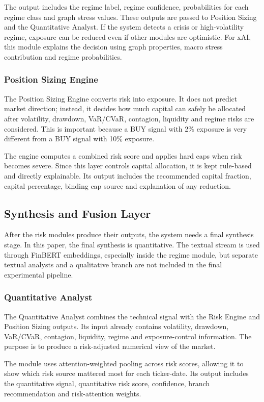 \documentclass[conference]{IEEEtran}
\begin{document}
The output includes the regime label, regime confidence, probabilities for each regime class and graph stress values. These outputs are passed to Position Sizing and the Quantitative Analyst. If the system detects a crisis or high-volatility regime, exposure can be reduced even if other modules are optimistic. For xAI, this module explains the decision using graph properties, macro stress contribution and regime probabilities.
\subsubsection{Position Sizing Engine}
The Position Sizing Engine converts risk into exposure. It does not predict market direction; instead, it decides how much capital can safely be allocated after volatility, drawdown, VaR/CVaR, contagion, liquidity and regime risks are considered. This is important because a BUY signal with 2\% exposure is very different from a BUY signal with 10\% exposure.

The engine computes a combined risk score and applies hard caps when risk becomes severe. Since this layer controls capital allocation, it is kept rule-based and directly explainable. Its output includes the recommended capital fraction, capital percentage, binding cap source and explanation of any reduction.


\subsection{Synthesis and Fusion Layer}
After the risk modules produce their outputs, the system needs a final synthesis stage. In this paper, the final synthesis is quantitative. The textual stream is used through FinBERT embeddings, especially inside the regime module, but separate textual analysts and a qualitative branch are not included in the final experimental pipeline.

\subsubsection{Quantitative Analyst}
The Quantitative Analyst combines the technical signal with the Risk Engine and Position Sizing outputs. Its input already contains volatility, drawdown, VaR/CVaR, contagion, liquidity, regime and exposure-control information. The purpose is to produce a risk-adjusted numerical view of the market.

The module uses attention-weighted pooling across risk scores, allowing it to show which risk source mattered most for each ticker-date. Its output includes the quantitative signal, quantitative risk score, confidence, branch recommendation and risk-attention weights.
\end{document}
